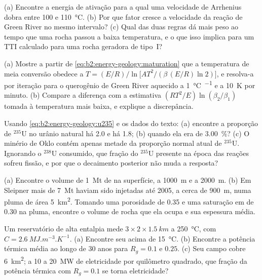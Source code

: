 \begin{exercise}[$\star\star$]\label{exo:b2:energy-geology:5}
(a) Encontre a energia de ativação para a qual uma velocidade de Arrhenius dobra entre 100 e
\qty{110}{\celsius}. (b) Por que fator cresce a velocidade da reação de Green River no mesmo
intervalo? (c) Qual das duas regras dá mais peso ao tempo que uma rocha passou a baixa temperatura,
e o que isso implica para um TTI calculado para uma rocha geradora de tipo~I?
\end{exercise}

\begin{exercise}[$\star\star$]\label{exo:b2:energy-geology:6}
(a) Mostre a partir de \eqref{eq:b2:energy-geology:maturation} que a temperatura de meia conversão obedece a
$T = (E/R)\big/\ln\bigl[A T^2/(\beta\,(E/R)\ln 2)\bigr]$, e resolva-a por iteração para o querogênio de Green
River aquecido a \qty{1}{\celsius\per\Myr} e a \qty{10}{K} por minuto. (b) Compare a
diferença com a estimativa $(RT^2/E)\ln(\beta_2/\beta_1)$ tomada à temperatura mais baixa, e
explique a discrepância.
\end{exercise}

\begin{exercise}[$\star\star$]\label{exo:b2:energy-geology:7}
Usando \eqref{eq:b2:energy-geology:u235} e os dados do texto: (a) encontre a proporção de $^{235}$U no
urânio natural há \qty{2.0}{\Ga} e há \qty{1.8}{\Ga}; (b) quando ela era de \qty{3.00}{\percent}?
(c) O minério de Oklo contém apenas metade da proporção normal atual de $^{235}$U. Ignorando o $^{238}$U
consumido, que fração do $^{235}$U presente na época das reações sofreu fissão, e
por que o decaimento posterior não muda a resposta?
\end{exercise}

\begin{exercise}[$\star\star$]\label{exo:b2:energy-geology:8}
(a) Encontre o volume de \qty{1}{Mt} de  na superfície, a \qty{1000}{m} e a
\qty{2000}{m}. (b) Em Sleipner mais de \qty{7}{Mt} haviam sido injetadas até 2005, a cerca de
\qty{900}{m}, numa pluma de área \qty{5}{km^2}. Tomando uma porosidade de 0.35 e uma saturação em 
de 0.30 na pluma, encontre o volume de rocha que ela ocupa e sua espessura média.
\end{exercise}

\begin{exercise}[$\star\star$]\label{exo:b2:energy-geology:9}
Um reservatório de alta entalpia mede $3 \times 2 \times \qty{1.5}{km}$ a \qty{250}{\celsius}, com
$C = \qty{2.6}{MJ.m^{-3}.K^{-1}}$. (a) Encontre seu  acima de \qty{15}{\celsius}. (b) Encontre a
potência térmica média ao longo de 30 anos para $R_g = 0.1$ e $0.25$. (c) Seu campo cobre \qty{6}{km^2};
a 10 a \qty{20}{MW} de eletricidade por quilômetro quadrado, que fração da potência térmica com
$R_g = 0.1$ se torna eletricidade?
\end{exercise}

